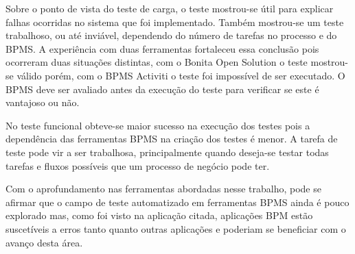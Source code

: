 \documentclass[12pt]{article}
\begin{document}
Sobre o ponto de vista do teste de carga, o teste mostrou-se útil para explicar falhas ocorridas no sistema que foi implementado. Também mostrou-se um teste trabalhoso, ou até inviável, dependendo do número de tarefas no processo e do BPMS. A experiência com duas ferramentas fortaleceu essa conclusão pois ocorreram duas situações distintas, com o Bonita Open Solution o teste mostrou-se válido porém, com o BPMS Activiti o teste foi impossível de ser executado. O BPMS deve ser avaliado antes da execução do teste para verificar se este é vantajoso ou não.

No teste funcional obteve-se maior sucesso na execução dos testes pois a dependência das ferramentas BPMS na criação dos testes é menor. A tarefa de teste pode vir a ser trabalhosa, principalmente quando deseja-se testar todas tarefas e fluxos possíveis que um processo de negócio pode ter.

Com o aprofundamento nas ferramentas abordadas nesse trabalho, pode se afirmar que o campo de teste automatizado em ferramentas BPMS ainda é pouco explorado mas, como foi visto na aplicação citada, aplicações BPM estão suscetíveis a erros tanto quanto outras aplicações e poderiam se beneficiar com o avanço desta área.





\end{document}
